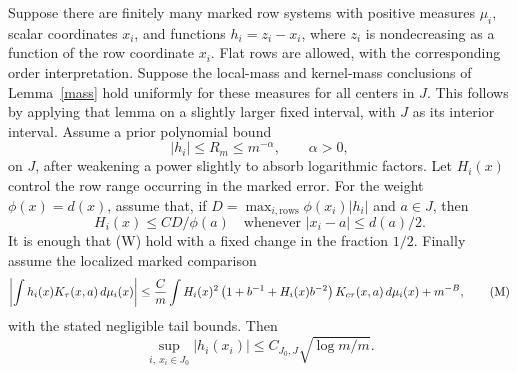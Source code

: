 \documentclass[11pt]{article}
\begin{document}
\begin{theorem}\label{maximum}
Suppose there are finitely many marked row systems with positive
measures $\mu_i$, scalar coordinates $x_i$, and functions
$h_i=z_i-x_i$, where $z_i$ is nondecreasing as a function of the row
coordinate $x_i$. Flat rows are allowed, with the corresponding order
interpretation. Suppose the local-mass and kernel-mass conclusions of
Lemma~\ref{mass} hold uniformly for these measures for all centers in
$J$. This follows by applying that lemma on a slightly larger fixed
interval, with $J$ as its interior interval.
Assume a prior polynomial bound
\[
 |h_i|\le R_m\le m^{-\alpha},\qquad \alpha>0,
\]
on $J$, after weakening a power slightly to absorb logarithmic factors.
Let $H_i(x)$ control the row range occurring in the marked error.
For the weight $\phi(x)=d(x)$, assume that,
if $D=\max_{i,\text{rows}}\phi(x_i)|h_i|$ and $a\in J$, then
\[
 H_i(x)\le C D/\phi(a)
 \quad\text{whenever }|x_i-a|\le d(a)/2.
 \tag{W}
\]
It is enough that (W) hold with a fixed change in the fraction $1/2$.
Finally assume the localized marked comparison
\[
 \left|\int h_i(x)K_\tau(x,a)\,d\mu_i(x)\right|
 \le {C\over m}\int H_i(x)^2
       \left(1+b^{-1}+H_i(x)b^{-2}\right)
       K_{c\tau}(x,a)\,d\mu_i(x)+m^{-B},
 \tag{M}
\]
with the stated negligible tail bounds. Then
\[
 \sup_{i,\ x_i\in J_0}|h_i(x_i)|
       \le C_{J_0,J}\sqrt{\log m/m}.
\]
\end{theorem}
\end{document}
